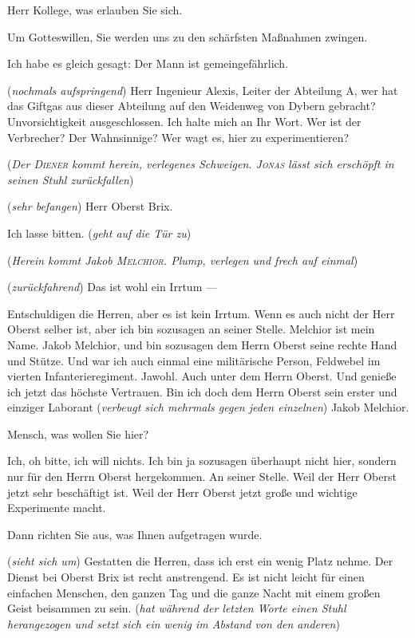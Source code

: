 \documentclass[
	final,
	a4paper,
	ngerman,
	mpinclude = true, %
	twoside = true,
	open = right,
	cleardoublepage = plain,
	DIV = 13,
	BCOR = 1cm,
	titlepage = firstiscover,
	]{scrbook}
\newcommand{\direction}[1]{(\textit{#1})}
\newcommand{\thecharacter}[1]{\textup{\textsc{#1}}\xspace}
\newcommand{\theAlexis}{\thecharacter{Alexis}}
\newcommand{\theThomsen}{\thecharacter{Thomsen}}
\newcommand{\theJonas}{\thecharacter{Jonas}}
\newcommand{\theMelchior}{\thecharacter{Melchior}}
\newcommand{\theDiener}{\thecharacter{Diener}}
\newcommand{\character}[1]{\item[#1]}
\newcommand{\Generaldirektor}{\character{Direktor}}
\newcommand{\Alexis}{\character{\theAlexis}}
\newcommand{\Thomsen}{\character{\theThomsen}}
\newcommand{\Jonas}{\character{\theJonas}}
\newcommand{\Melchior}{\character{\theMelchior}}
\newcommand{\Diener}{\character{\theDiener}}
\begin{document}
\begin{play}
\Thomsen
Herr Kollege, was erlauben Sie sich.

\Generaldirektor
Um Gotteswillen, Sie werden uns zu den schärfsten Maßnahmen zwingen.

\Alexis
Ich habe es gleich gesagt: Der Mann ist gemeingefährlich.

\Jonas
\direction{nochmals aufspringend} Herr Ingenieur Alexis, Leiter der Abteilung A, wer hat das Giftgas aus dieser Abteilung auf den Weidenweg von Dybern gebracht? Unvorsichtigkeit ausgeschlossen. Ich halte mich an Ihr Wort. Wer ist der Verbrecher? Der Wahnsinnige? Wer wagt es, hier zu experimentieren?

\direction{Der \theDiener kommt herein, verlegenes Schweigen. \theJonas lässt sich erschöpft in seinen Stuhl zurückfallen}

\Diener
\direction{sehr befangen} Herr Oberst Brix.

\Generaldirektor
Ich lasse bitten. \direction{geht auf die Tür zu}

\direction{Herein kommt Jakob \theMelchior. Plump, verlegen und frech auf einmal}

\Generaldirektor
\direction{zurückfahrend} Das ist wohl ein Irrtum ---

\Melchior
Entschuldigen die Herren, aber es ist kein Irrtum. Wenn es auch nicht der Herr Oberst selber ist, aber ich bin sozusagen an seiner Stelle. Melchior ist mein Name. Jakob Melchior, und bin sozusagen dem Herrn Oberst seine rechte Hand und Stütze. Und war ich auch einmal eine militärische Person, Feldwebel im vierten Infanterieregiment. Jawohl. Auch unter dem Herrn Oberst. Und genieße ich jetzt das höchste Vertrauen. Bin ich doch dem Herrn Oberst sein erster und einziger Laborant \direction{verbeugt sich mehrmals gegen jeden einzelnen} Jakob Melchior.

\Generaldirektor
Mensch, was wollen Sie hier?

\Melchior
Ich, oh bitte, ich will nichts. Ich bin ja sozusagen überhaupt nicht hier, sondern nur für den Herrn Oberst hergekommen. An seiner Stelle. Weil der Herr Oberst jetzt sehr beschäftigt ist. Weil der Herr Oberst jetzt große und wichtige Experimente macht.

\Generaldirektor
Dann richten Sie aus, was Ihnen aufgetragen wurde.

\Melchior
\direction{sieht sich um} Gestatten die Herren, dass ich erst ein wenig Platz nehme. Der Dienst bei Oberst Brix ist recht anstrengend. Es ist nicht leicht für einen einfachen Menschen, den ganzen Tag und die ganze Nacht mit einem großen Geist beisammen zu sein. \direction{hat während der letzten Worte einen Stuhl herangezogen und setzt sich ein wenig im Abstand von den anderen}


\end{play}
\end{document}
